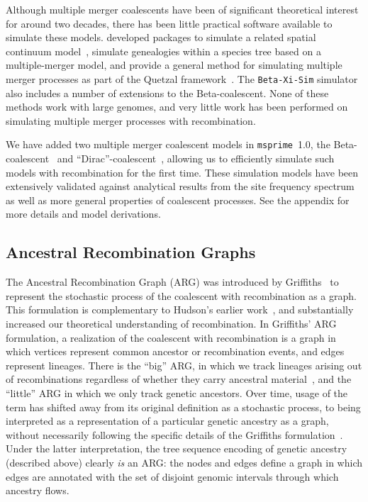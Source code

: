 \documentclass[9pt,twocolumn,twoside,lineno]{gsajnl}
\newcommand{\msprime}[0]{\texttt{msprime}}
\begin{document}
Although multiple merger coalescents have been of significant theoretical
interest for around two decades, there has been little practical software
available to simulate these models.
\cite{kelleher2013coalescent,kelleher2014coalescent} developed packages to
simulate a related spatial continuum model~\citep{barton2010new},
\cite{zhu2015hybrid} simulate genealogies within a species tree
based on a multiple-merger model, and
\cite{becheler2020occupancy} provide a general method for simulating
multiple merger processes
as part of the Quetzal framework~\citep{becheler2019quetzal}.
The \texttt{Beta-Xi-Sim} simulator~\citep{koskela2018multi,koskela2019robust}
also includes a number of extensions to the Beta-coalescent.
None of these methods work with large genomes, and very little work
has been performed on simulating multiple merger processes with recombination.

We have added two multiple merger coalescent models in \msprime\ 1.0, the
Beta-coalescent~\citep{schweinsberg03} and
``Dirac''-coalescent~\citep{BBE13}, allowing us to efficiently simulate
such models with recombination for the first time.
These simulation models have been extensively validated against
analytical results from the site frequency
spectrum~\citep{birkner2013statistical,blath2016site,hobolth2019phase}
 as well as more general properties of coalescent processes.
See the  appendix for more details and model derivations.

\subsection*{Ancestral Recombination Graphs}
\label{sec-arg}

The Ancestral Recombination Graph (ARG) was introduced by
Griffiths~\citep{griffiths1991two,griffiths1997ancestral}
to represent the stochastic process of the coalescent with recombination as a graph.
This formulation is complementary to Hudson's earlier
work~\citep{hudson1983properties}, and substantially increased our theoretical
understanding of recombination. In Griffiths' ARG formulation,
a realization of the coalescent with recombination is a graph in which
vertices represent common ancestor or recombination events, and edges represent
lineages. There is the ``big'' ARG, in which we track lineages arising out of
recombinations regardless of whether they carry ancestral
material~\citep{ethier1990two},
and the ``little'' ARG in which we only track genetic ancestors.
Over time, usage of the term
has shifted away from its original definition as a stochastic process,
to being interpreted as a representation of a particular genetic ancestry
as a graph, without necessarily following the specific details of the Griffiths
formulation~\citep[e.g.][]{minichiello2006mapping,mathieson2020ancestry}.
Under the latter interpretation,
the tree sequence encoding of genetic ancestry (described above)
clearly \emph{is} an ARG: the nodes and edges
define a graph in which edges are annotated with the
set of disjoint genomic intervals
through which ancestry flows.
\end{document}
